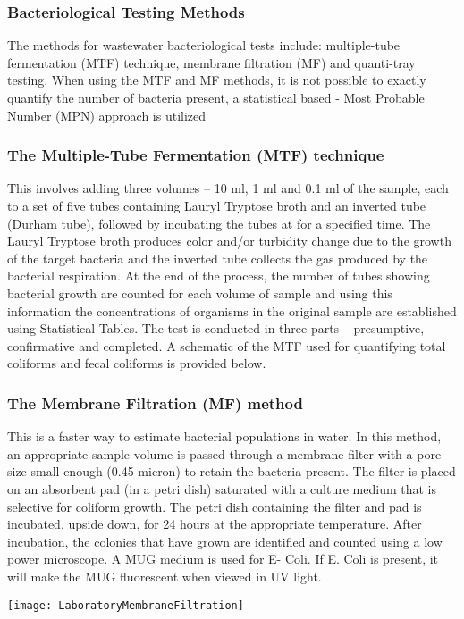 \subsubsection{Bacteriological Testing Methods}
The methods for wastewater bacteriological tests include:  multiple-tube fermentation (MTF) technique, membrane filtration (MF) and quanti-tray testing.  When using the MTF and MF methods, it is not possible to exactly quantify the number of bacteria present, a statistical based - Most Probable Number (MPN) approach is utilized\\
\subsubsection{The Multiple-Tube Fermentation (MTF) technique}
This involves adding three volumes – 10 ml, 1 ml and 0.1 ml of the sample, each to a set of five tubes containing Lauryl Tryptose broth and an inverted tube (Durham tube), followed by incubating the tubes at  for a specified time.  The Lauryl Tryptose broth produces color and/or turbidity change due to the growth of the target bacteria and the inverted tube collects the gas produced by the bacterial respiration.  At the end of the process, the number of tubes showing bacterial growth are counted for each volume of sample and using this information the concentrations of organisms in the original sample are established using Statistical Tables.  The test is conducted in three parts – presumptive, confirmative and completed.  A schematic of the MTF used for quantifying total coliforms and fecal coliforms is provided below.\\
\newpage
\thispagestyle{empty}


\newpage
\subsubsection{The Membrane Filtration (MF) method}
This is a faster way to estimate bacterial populations in water.  In this method, an appropriate sample volume is passed through a membrane filter with a pore size small enough (0.45 micron) to retain the bacteria present. The filter is placed on an absorbent pad (in a petri dish) saturated with a culture medium that is selective for coliform growth. The petri dish containing the filter and pad is incubated, upside down, for 24 hours at the appropriate temperature. After incubation, the colonies that have grown are identified and counted using a low power microscope. A MUG medium is used for E- Coli.  If E. Coli is present, it will make the MUG fluorescent when viewed in UV light. 
\begin{center}
\texttt{[image: LaboratoryMembraneFiltration]}
\end{center}
\pagebreak

